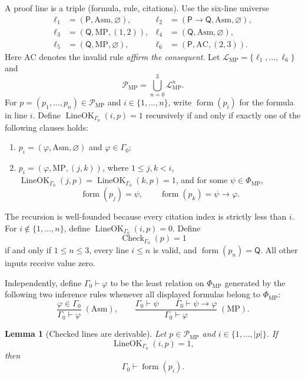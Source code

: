 \documentclass[11pt,oneside]{book}
\newtheorem{lemma}[definition]{Lemma}
\theoremstyle{remark}
\DeclareMathOperator{\ProofCheck}{Check}
\begin{document}
A proof line is a triple (formula, rule, citations). Use the six-line universe
\begin{align*}
\ell_1&=(\mathsf P,\mathrm{Asm},\varnothing),&
\ell_2&=(\mathsf P\to\mathsf Q,\mathrm{Asm},\varnothing),\\
\ell_3&=(\mathsf Q,\mathrm{MP},(1,2)),&
\ell_4&=(\mathsf Q,\mathrm{Asm},\varnothing),\\
\ell_5&=(\mathsf Q,\mathrm{MP},\varnothing),&
\ell_6&=(\mathsf P,\mathrm{AC},(2,3)).
\end{align*}
Here $\mathrm{AC}$ denotes the invalid rule \emph{affirm the consequent}. Let
$\mathcal L_{\mathrm{MP}}=\{\ell_1,\ldots,\ell_6\}$ and
\[
\mathcal P_{\mathrm{MP}}
=\bigcup_{n=0}^{3}\mathcal L_{\mathrm{MP}}^n.
\]
For $p=(p_1,\ldots,p_n)\in\mathcal P_{\mathrm{MP}}$ and
$i\in\{1,\ldots,n\}$, write $\operatorname{form}(p_i)$ for the formula in
line $i$. Define $\operatorname{LineOK}_{\Gamma_0}(i,p)=1$ recursively if and
only if exactly one of the following clauses holds:
\begin{enumerate}
  \item $p_i=(\varphi,\mathrm{Asm},\varnothing)$ and
  $\varphi\in\Gamma_0$;
  \item $p_i=(\varphi,\mathrm{MP},(j,k))$, where
  $1\le j,k<i$,
  $\operatorname{LineOK}_{\Gamma_0}(j,p)=
  \operatorname{LineOK}_{\Gamma_0}(k,p)=1$, and for some
  $\psi\in\Phi_{\mathrm{MP}}$,
  \[
  \operatorname{form}(p_j)=\psi,
  \qquad
  \operatorname{form}(p_k)=\psi\to\varphi.
  \]
\end{enumerate}
The recursion is well-founded because every citation index is strictly less
than $i$. For $i\notin\{1,\ldots,n\}$, define
$\operatorname{LineOK}_{\Gamma_0}(i,p)=0$. Define
\[
\ProofCheck_{\Gamma_0}(p)=1
\]
if and only if $1\le n\le3$, every line $i\le n$ is valid, and
$\operatorname{form}(p_n)=\mathsf Q$. All other inputs receive value zero.

Independently, define $\Gamma_0\vdash\varphi$ to be the least relation on
$\Phi_{\mathrm{MP}}$ generated by the following two inference rules whenever
all displayed formulas belong to $\Phi_{\mathrm{MP}}$:
\[
\frac{\varphi\in\Gamma_0}{\Gamma_0\vdash\varphi}
\;(\mathrm{Asm}),
\qquad
\frac{\Gamma_0\vdash\psi\qquad
\Gamma_0\vdash\psi\to\varphi}
{\Gamma_0\vdash\varphi}
\;(\mathrm{MP}).
\]

\begin{lemma}[Checked lines are derivable]
Let $p\in\mathcal P_{\mathrm{MP}}$ and
$i\in\{1,\ldots,|p|\}$. If
\[
\operatorname{LineOK}_{\Gamma_0}(i,p)=1,
\]
then
\[
\Gamma_0\vdash\operatorname{form}(p_i).
\]
\end{lemma}
\end{document}
